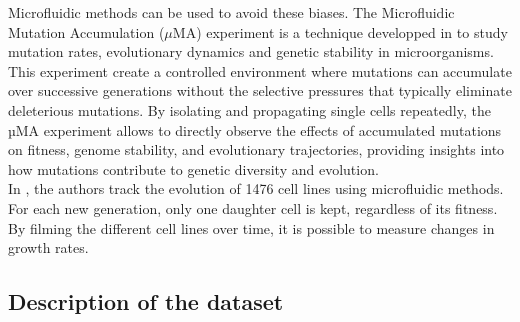Microfluidic methods can be used to avoid these biases. The Microfluidic Mutation Accumulation ($\mu$MA) experiment is a technique developped in \cite{robert2018mutation,robert2019real} to study mutation rates, evolutionary dynamics and genetic stability in microorganisms. This experiment create a controlled environment where mutations can accumulate over successive generations without the selective pressures that typically eliminate deleterious mutations. By isolating and propagating single cells repeatedly, the µMA experiment allows to directly observe the effects of accumulated mutations on fitness, genome stability, and evolutionary trajectories, providing insights into how mutations contribute to genetic diversity and evolution. \\

In \cite{robert2018mutation}, the authors track the evolution of 1476 cell lines using microfluidic methods. For each new generation, only one daughter cell is kept, regardless of its fitness. \\
By filming the different cell lines over time, it is possible to measure changes in growth rates.

\subsection{Description of the dataset}


